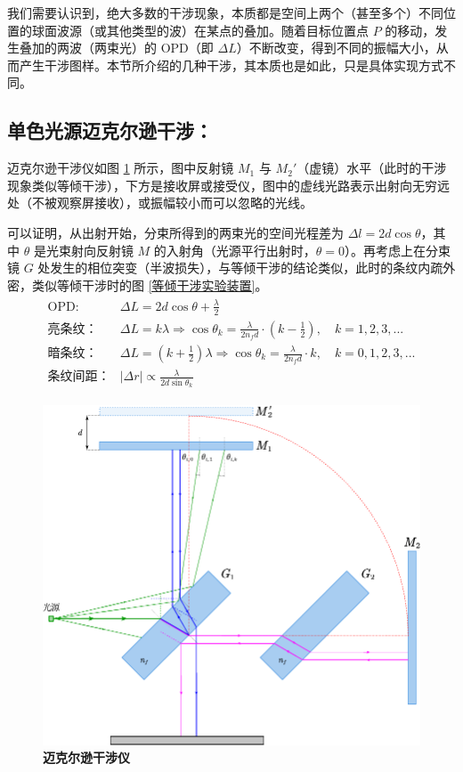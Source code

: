 \documentclass[UTF8]{report}
\theoremstyle{MyLineTheoremStyle} %
\theoremstyle{MyBlockTheoremStyle} %
\theoremstyle{MySubsubsectionStyle} %
\begin{document}
我们需要认识到，绝大多数的干涉现象，本质都是空间上两个（甚至多个）不同位置的球面波源（或其他类型的波）在某点的叠加。随着目标位置点 $P$ 的移动，发生叠加的两波（两束光）的 OPD（即 $\Delta L$）不断改变，得到不同的振幅大小，从而产生干涉图样。本节所介绍的几种干涉，其本质也是如此，只是具体实现方式不同。

\subsection{单色光源迈克尔逊干涉：}

迈克尔逊干涉仪如图 \ref{迈克尔逊干涉仪} 所示，图中反射镜 $M_1$ 与 $M_2'$（虚镜）水平（此时的干涉现象类似等倾干涉），下方是接收屏或接受仪，图中的虚线光路表示出射向无穷远处（不被观察屏接收），或振幅较小而可以忽略的光线。

可以证明，从出射开始，分束所得到的两束光的空间光程差为 $\Delta l = 2 d \cos \theta$，其中 $\theta$ 是光束射向反射镜 $M$ 的入射角（光源平行出射时，$\theta = 0$）。再考虑上在分束镜 $G$ 处发生的相位突变（半波损失），与等倾干涉的结论类似，此时的条纹内疏外密，类似等倾干涉时的图 \ref{等倾干涉实验装置}。
\begin{align}
\begin{matrix}
\displaystyle \text{OPD: }& \Delta L = 2 d \cos \theta + \frac{\lambda}{2} \\ 
\displaystyle \text{亮条纹：}&\Delta L = k \lambda \Longrightarrow \cos \theta_k = \frac{\lambda}{2 n_f d} \cdot (k - \frac{1}{2}),\quad k = 1, 2, 3, ... \\ 
\displaystyle \text{暗条纹：}&\Delta L = (k + \frac{1}{2}) \lambda \Longrightarrow \cos \theta_k = \frac{\lambda}{2 n_f d} \cdot k,\quad k = 0, 1, 2, 3, ...\\ 
\displaystyle \text{条纹间距：}& | \Delta r | \propto  \frac{\lambda}{2d \sin \theta_k}
\end{matrix}
\end{align}


\begin{figure}[H]\centering
    \includegraphics[width=0.8\columnwidth]{assets/3/迈克尔逊干涉仪.pdf}
    \caption{\bfseries 迈克尔逊干涉仪}\label{迈克尔逊干涉仪}
\end{figure}
\end{document}

